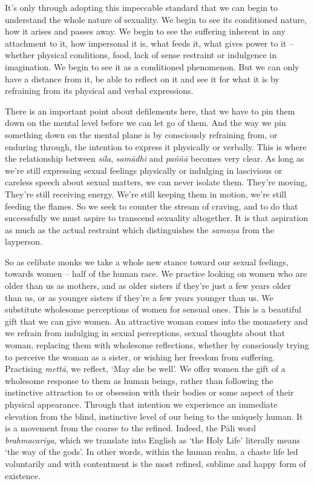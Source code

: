 It's only through adopting this impeccable standard that we can begin to
understand the whole nature of sexuality. We begin to see its
conditioned nature, how it arises and passes away. We begin to see the
suffering inherent in any attachment to it, how impersonal it is, what
feeds it, what gives power to it -- whether physical conditions, food, 
lack of sense restraint or indulgence in imagination. We begin to see it
as a conditioned phenomenon. But we can only have a distance from it, be
able to reflect on it and see it for what it is by refraining from its
physical and verbal expressions. 

There is an important point about defilements here, that we have to pin
them down on the mental level before we can let go of them. And the way
we pin something down on the mental plane is by consciously refraining
from, or enduring through, the intention to express it physically or
verbally. This is where the relationship between \emph{sīla}, 
\emph{samādhi} and \emph{paññā} becomes very clear. As long as we're
still expressing sexual feelings physically or indulging in lascivious
or careless speech about sexual matters, we can never isolate them. 
They're moving, They're still receiving energy. We're still keeping them
in motion, we're still feeding the flames. So we seek to counter the
stream of craving, and to do that successfully we must aspire to
transcend sexuality altogether. It is that aspiration as much as the
actual restraint which distinguishes the \emph{samaṇa} from the
layperson. 

So as celibate monks we take a whole new stance toward our sexual
feelings, towards women -- half of the human race. We practice looking
on women who are older than us as mothers, and as older sisters if
they're just a few years older than us, or as younger sisters if they're
a few years younger than us. We substitute wholesome perceptions of
women for sensual ones. This is a beautiful gift that we can give women. 
An attractive woman comes into the monastery and we refrain from
indulging in sexual perceptions, sexual thoughts about that woman, 
replacing them with wholesome reflections, whether by consciously trying
to perceive the woman as a sister, or wishing her freedom from
suffering. Practising \emph{mettā}, we reflect, `May she be well'. We
offer women the gift of a wholesome response to them as human beings, 
rather than following the instinctive attraction to or obsession with their
bodies or some aspect of their physical appearance. Through that
intention we experience an immediate elevation from the blind, 
instinctive level of our being to the uniquely human. It is a movement
from the coarse to the refined. Indeed, the Pāli word
\emph{brahmacariya}, which we translate into English as `the Holy Life'
literally means `the way of the gods'. In other words, within the human
realm, a chaste life led voluntarily and with contentment is the most
refined, sublime and happy form of existence. 

